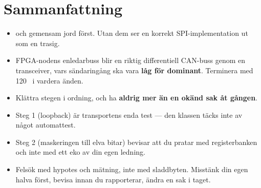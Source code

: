 \section*{Sammanfattning}

\begin{itemize}
  \item {} och gemensam jord först. Utan dem ser en korrekt SPI-implementation ut som
    en trasig.
  \item FPGA-nodens enledarbuss blir en riktig differentiell CAN-buss genom en transceiver, vars
    sändaringång ska vara \textbf{låg för dominant}. Terminera med 120~\textohm{} i vardera änden.
  \item Klättra stegen i ordning, och ha \textbf{aldrig mer än en okänd sak åt gången}.
  \item Steg 1 (loopback) är transportens enda test --- den klassen täcks inte av något automattest.
  \item Steg 2 (maskeringen till elva bitar) bevisar att du pratar med registerbanken och inte med
    ett eko av din egen ledning.
  \item Felsök med hypotes och mätning, inte med sladdbyten. Misstänk din egen halva först, bevisa
    innan du rapporterar, ändra en sak i taget.
\end{itemize}

